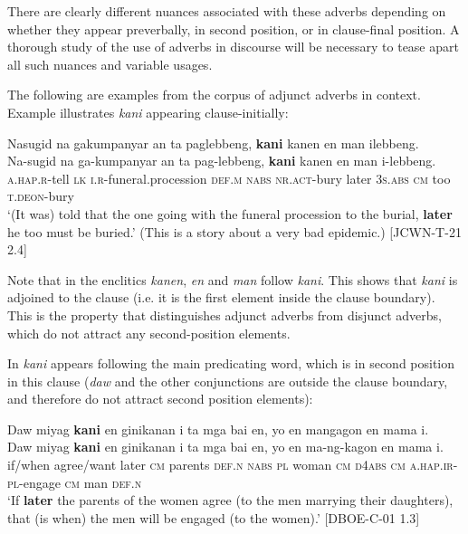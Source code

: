 There are clearly different nuances associated with these adverbs depending on whether they appear preverbally, in second position, or in clause-final position. A thorough study of the use of adverbs in discourse will be necessary to tease apart all such nuances and variable usages.

The following are examples from the corpus of adjunct adverbs in context. Example  illustrates \textit{kani} appearing clause-initially:

\ea
\label{bkm:Ref480191239}
Nasugid  na  gakumpanyar  an  ta  paglebbeng, \textbf{kani}  kanen  en  man  ilebbeng. \\\smallskip
 \gll Na-sugid  na  ga-kumpanyar  an  ta  pag-lebbeng, \textbf{kani}  kanen  en  man  i-lebbeng. \\
\textsc{a.hap.r}-tell  \textsc{lk}  \textsc{i.r}-funeral.procession  \textsc{def.m}  \textsc{nabs}  \textsc{nr.act}-bury later  3\textsc{s.abs}  \textsc{cm}  too  \textsc{t.deon}-bury \\
\glt `(It was) told that the one going with the funeral procession to the burial, \textbf{later} he too must be buried.’ (This is a story about a very bad epidemic.) [JCWN-T-21 2.4]
\z

Note that in  the enclitics \textit{kanen}, \textit{en} and \textit{man} follow \textit{kani}. This shows that \textit{kani} is adjoined to the clause (i.e. it is the first element inside the clause boundary). This is the property that distinguishes adjunct adverbs from disjunct adverbs, which do not attract any second-position elements.

In  \textit{kani} appears following the main predicating word, which is in second position in this clause (\textit{daw} and the other conjunctions are outside the clause boundary, and therefore do not attract second position elements):

\ea
\label{bkm:Ref481496721}
Daw  miyag  \textbf{kani} en  ginikanan  i  ta  mga  bai  en, yo  en  mangagon  en  mama  i. \\\smallskip
 \gll Daw  miyag  \textbf{kani} en  ginikanan  i  ta  mga  bai  en, yo  en  ma-ng-kagon  en  mama  i. \\
if/when  agree/want  later  \textsc{cm}   parents  \textsc{def.n}  \textsc{nabs}  \textsc{pl}  woman  \textsc{cm}  \textsc{d4abs}  \textsc{cm}  \textsc{a.hap.ir}-\textsc{pl}-engage  \textsc{cm}  man  \textsc{def.n} \\
\glt `If \textbf{later} the parents of the women agree (to the men marrying their daughters), that (is when) the men will be engaged (to the women).’ [DBOE-C-01 1.3]
\z

